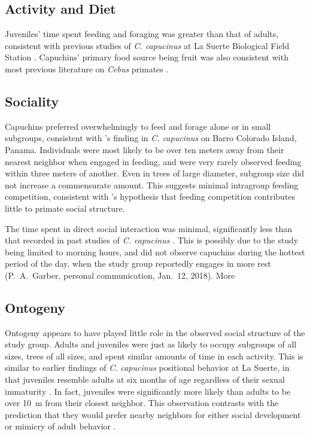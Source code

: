 \documentclass{../../../coursework}
\begin{document}
\subsection{Activity and Diet}

Juveniles' time spent feeding and foraging was greater than that of adults,
consistent with previous studies of \emph{C. capucinus} at La Suerte
Biological Field Station \parencite{Bezanson2009}. Capuchins' primary food
source being fruit was also consistent with most previous literature on
\emph{Cebus} primates \parencite{Jack2011}.

\subsection{Sociality}

Capuchins preferred overwhelmingly to feed and forage alone or in small
subgroups, consistent with \textcite{Phillips1995}'s finding in
\emph{C. capucinus} on Barro Colorado Island, Panama. Individuals were most
likely to be over ten meters away from their nearest neighbor when engaged in
feeding, and were very rarely observed feeding within three meters of another.
Even in trees of large diameter, subgroup size did not increase a commensurate
amount. This suggests minimal intragroup feeding competition, consistent with
\textcite{Sussman2011}'s hypothesis that feeding competition contributes
little to primate social structure.

The time spent in direct social interaction was minimal, significantly less
than that recorded in past studies of \emph{C. capucinus}
\parencite{Sussman2005}. This is possibly due to the study being limited to
morning hours, and did not observe capuchins during the hottest period of the
day, when the study group reportedly engages in more rest (P.~A.~Garber, personal communication, Jan.~12, 2018). More 

\subsection{Ontogeny}

Ontogeny appears to have played little role in the observed social structure
of the study group. Adults and juveniles were just as likely to occupy
subgroups of all sizes, trees of all sizes, and spent similar amounts of time
in each activity. This is similar to earlier findings of \emph{C. capucinus}
positional behavior at La Suerte, in that juveniles resemble adults at six
months of age regardless of their sexual immaturity \parencite{Bezanson2009}.
In fact, juveniles were significantly more likely than adults to be over
\SI{10}{\metre} from their closest neighbor. This observation contrasts with
the prediction that they would prefer nearby neighbors for either social
development \parencite{Strier2007} or mimicry of adult behavior \parencite{Sherrow2011}.
\end{document}
